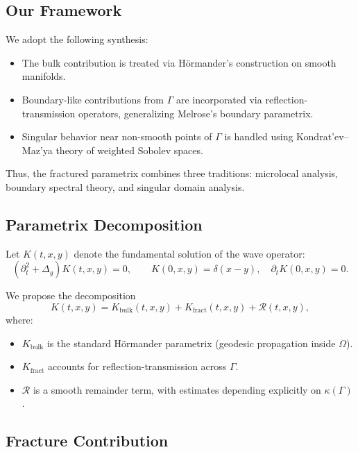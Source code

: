 \subsection*{Our Framework}

We adopt the following synthesis:

\begin{itemize}
\item The bulk contribution is treated via Hörmander’s construction on smooth manifolds.
\item Boundary-like contributions from $\Gamma$ are incorporated via reflection-transmission operators, generalizing Melrose’s boundary parametrix.
\item Singular behavior near non-smooth points of $\Gamma$ is handled using Kondrat’ev–Maz’ya theory of weighted Sobolev spaces.
\end{itemize}

Thus, the fractured parametrix combines three traditions: microlocal analysis, boundary spectral theory, and singular domain analysis.

\subsection{Parametrix Decomposition}

Let $K(t,x,y)$ denote the fundamental solution of the wave operator:
\[
(\partial_t^2 + \Delta_g) K(t,x,y) = 0, \qquad K(0,x,y) = \delta(x-y), \quad \partial_t K(0,x,y) = 0.
\]

We propose the decomposition
\[
K(t,x,y) = K_{\mathrm{bulk}}(t,x,y) + K_{\mathrm{fract}}(t,x,y) + \mathcal{R}(t,x,y),
\]
where:
\begin{itemize}
\item $K_{\mathrm{bulk}}$ is the standard Hörmander parametrix (geodesic propagation inside $\Omega$).
\item $K_{\mathrm{fract}}$ accounts for reflection-transmission across $\Gamma$.
\item $\mathcal{R}$ is a smooth remainder term, with estimates depending explicitly on $\kappa(\Gamma)$.
\end{itemize}

\subsection{Fracture Contribution}

